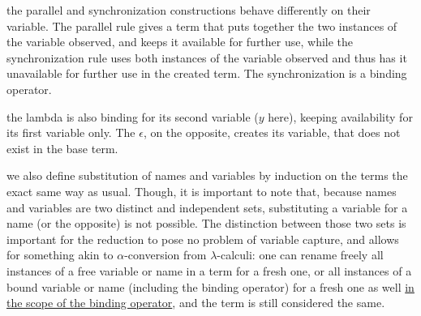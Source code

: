 \remark the parallel and synchronization constructions behave differently on their variable. The parallel rule gives a term that puts together the two instances of the variable observed, and keeps it available for further use, while the synchronization rule uses both instances of the variable observed and thus has it unavailable for further use in the created term. The synchronization is a binding operator.

\remark the lambda is also binding for its second variable ($y$ here), keeping availability for its first variable only. The $\epsilon$, on the opposite, creates its variable, that does not exist in the base term.

\remark we also define substitution of names and variables by induction on the terms the exact same way as usual. Though, it is important to note that, because names and variables are two distinct and independent sets, substituting a variable for a name (or the opposite) is not possible. The distinction between those two sets is important for the reduction to pose no problem of variable capture, and allows for something akin to $\alpha$-conversion from $\lambda$-calculi: one can rename freely all instances of a free variable or name in a term for a fresh one, or all instances of a bound variable or name (including the binding operator) for a fresh one as well \underline{in the scope of the binding operator}, and the term is still considered the same.\\


